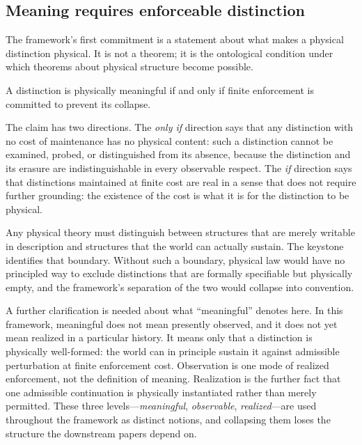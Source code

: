 \documentclass[11pt]{article}
\begin{document}
\subsection{Meaning requires enforceable distinction}\label{sec:keystone_claim}

The framework's first commitment is a statement about what makes a physical distinction physical. It is not a theorem; it is the ontological condition under which theorems about physical structure become possible.

\begin{tcolorbox}[apfbox, title={The Keystone}]
A distinction is physically meaningful if and only if finite enforcement is committed to prevent its collapse.
\end{tcolorbox}

\noindent The claim has two directions. The \emph{only if} direction says that any distinction with no cost of maintenance has no physical content: such a distinction cannot be examined, probed, or distinguished from its absence, because the distinction and its erasure are indistinguishable in every observable respect. The \emph{if} direction says that distinctions maintained at finite cost are real in a sense that does not require further grounding: the existence of the cost is what it is for the distinction to be physical.

Any physical theory must distinguish between structures that are merely writable in description and structures that the world can actually sustain. The keystone identifies that boundary. Without such a boundary, physical law would have no principled way to exclude distinctions that are formally specifiable but physically empty, and the framework's separation of the two would collapse into convention.

A further clarification is needed about what ``meaningful'' denotes here. In this framework, meaningful does not mean presently observed, and it does not yet mean realized in a particular history. It means only that a distinction is physically well-formed: the world can in principle sustain it against admissible perturbation at finite enforcement cost. Observation is one mode of realized enforcement, not the definition of meaning. Realization is the further fact that one admissible continuation is physically instantiated rather than merely permitted. These three levels---\emph{meaningful}, \emph{observable}, \emph{realized}---are used throughout the framework as distinct notions, and collapsing them loses the structure the downstream papers depend on.
\end{document}
